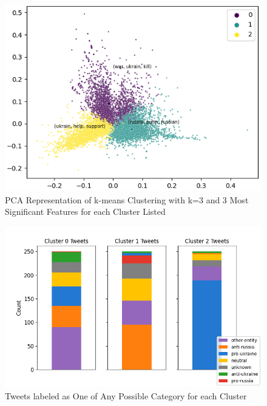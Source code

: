\documentclass[12pt,letterpaper,oneside,titlepage]{article}
\begin{document}
\begin{figure}[ht]
    \centering
    \includegraphics[scale=0.67]{kmeans-3}
    \captionsetup{justification=centering}
    \caption{PCA Representation of k-means Clustering with k=3 and 3 Most Significant Features for each Cluster Listed}
\end{figure}
\FloatBarrier
\begin{figure}[ht]
    \centering
    \includegraphics[scale=0.6]{quadclass-kmeans}
    \captionsetup{justification=centering}
    \caption{Tweets labeled as One of Any Possible Category for each Cluster}
\end{figure}
\FloatBarrier
\end{document}
